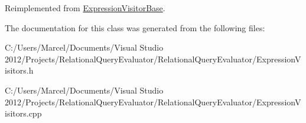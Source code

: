 Reimplemented from \hyperlink{class_expression_visitor_base_a1ac638b82248ff9e1582dbf520dc6ae4}{Expression\+Visitor\+Base}.



The documentation for this class was generated from the following files\+:\begin{DoxyCompactItemize}
\item 
C\+:/\+Users/\+Marcel/\+Documents/\+Visual Studio 2012/\+Projects/\+Relational\+Query\+Evaluator/\+Relational\+Query\+Evaluator/Expression\+Visitors.\+h\item 
C\+:/\+Users/\+Marcel/\+Documents/\+Visual Studio 2012/\+Projects/\+Relational\+Query\+Evaluator/\+Relational\+Query\+Evaluator/Expression\+Visitors.\+cpp\end{DoxyCompactItemize}
